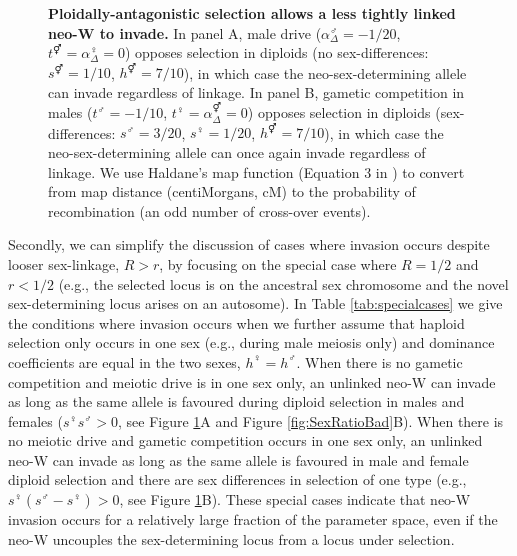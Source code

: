 \documentclass[10pt,letterpaper]{article}
\begin{document}
\begin{figure}[!h]
\centering
\caption{
{\bf Ploidally-antagonistic selection allows a less tightly linked neo-W to invade.}
In panel A, male drive ($\alpha^\male_{\Delta} = -1/20$, $t^\Hermaphrodite = \alpha^\female_{\Delta} = 0$) opposes selection in diploids (no sex-differences: $s^\Hermaphrodite = 1/10$, $h^\Hermaphrodite = 7/10$), in which case the neo-sex-determining allele can invade regardless of linkage.   
In panel B, gametic competition in males ($t^\male = -1/10$, $t^\female = \alpha^\Hermaphrodite_{\Delta} = 0$) opposes selection in diploids (sex-differences: $s^\male = 3/20$, $s^\female = 1/20$, $h^\Hermaphrodite = 7/10$), in which case the neo-sex-determining allele can once again invade regardless of linkage.
We use Haldane's map function (Equation 3 in \cite{Haldane1919}) to convert from map distance (centiMorgans, cM) to the probability of recombination (an odd number of cross-over events).   
}
\label{fig:Combination_Centimorgans}
\end{figure}


Secondly, we can simplify the discussion of cases where invasion occurs despite looser sex-linkage, $R>r$, by focusing on the special case where $R=1/2$ and $r<1/2$ (e.g., the selected locus is on the ancestral sex chromosome and the novel sex-determining locus arises on an autosome). 
In Table \ref{tab:specialcases} we give the conditions where invasion occurs when we further assume that haploid selection only occurs in one sex (e.g., during male meiosis only) and dominance coefficients are equal in the two sexes, $h^\female=h^\male$. 
When there is no gametic competition and meiotic drive is in one sex only, an unlinked neo-W can invade as long as the same allele is favoured during diploid selection in males and females ($s^\female s^\male>0$, see Figure \ref{fig:Combination_Centimorgans}A and Figure \ref{fig:SexRatioBad}B). %
When there is no meiotic drive and gametic competition occurs in one sex only, an unlinked neo-W can invade as long as the same allele is favoured in male and female diploid selection and there are sex differences in selection of one type (e.g., $s^\female(s^\male-s^\female)>0$, see Figure \ref{fig:Combination_Centimorgans}B). %
These special cases indicate that neo-W invasion occurs for a relatively large fraction of the parameter space, even if the neo-W uncouples the sex-determining locus from a locus under selection. 
\end{document}
